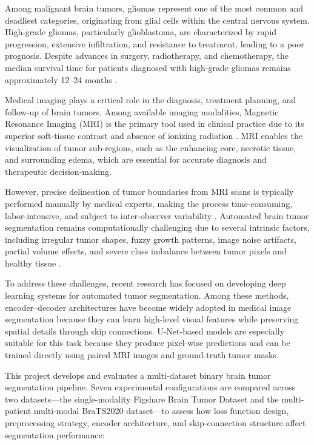 \documentclass[a4paper,12pt]{article}
\begin{document}
Among malignant brain tumors, gliomas represent one of the most common and deadliest categories,
originating from glial cells within the central nervous system. High-grade gliomas, particularly
glioblastoma, are characterized by rapid progression, extensive infiltration, and resistance to
treatment, leading to a poor prognosis. Despite advances in surgery, radiotherapy, and
chemotherapy, the median survival time for patients diagnosed with high-grade gliomas remains
approximately 12--24 months \cite{ostrom2020cbtrus,louis2021who}.

Medical imaging plays a critical role in the diagnosis, treatment planning, and follow-up of
brain tumors. Among available imaging modalities, Magnetic Resonance Imaging (MRI) is the
primary tool used in clinical practice due to its superior soft-tissue contrast and absence of
ionizing radiation \cite{shukla2017advanced}. MRI enables the visualization of tumor
sub-regions, such as the enhancing core, necrotic tissue, and surrounding edema, which are
essential for accurate diagnosis and therapeutic decision-making.

However, precise delineation of tumor boundaries from MRI scans is typically performed manually
by medical experts, making the process time-consuming, labor-intensive, and subject to
inter-observer variability \cite{amin2025dual}. Automated brain tumor segmentation remains
computationally challenging due to several intrinsic factors, including irregular tumor shapes,
fuzzy growth patterns, image noise artifacts, partial volume effects, and severe class imbalance
between tumor pixels and healthy tissue \cite{tohka2014partial}.

To address these challenges, recent research has focused on developing deep learning systems for
automated tumor segmentation. Among these methods, encoder--decoder architectures have become
widely adopted in medical image segmentation because they can learn high-level visual features
while preserving spatial details through skip connections. U-Net-based models are especially
suitable for this task because they produce pixel-wise predictions and can be trained directly
using paired MRI images and ground-truth tumor masks.

This project develops and evaluates a multi-dataset binary brain tumor segmentation pipeline.
Seven experimental configurations are compared across two datasets---the single-modality
Figshare Brain Tumor Dataset and the multi-patient multi-modal BraTS2020 dataset---to assess how
loss function design, preprocessing strategy, encoder architecture, and skip-connection structure
affect segmentation performance:
\end{document}
